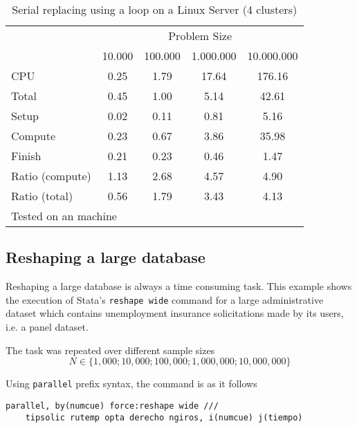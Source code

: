 \documentclass[letterpaper, 10pt]{article}
\begin{document}
\begin{table}[!h]
\centering
\caption{Serial replacing using a loop on a Linux Server (4 clusters)\label{tab:serialreplace_linux}}
\begin{tabular}{l*{4}{c}}\hline
& \multicolumn{4}{c}{Problem Size} \\
& 10.000 &           100.000 &          1.000.000 &         10.000.000 \\ \hline
CPU &     0.25 &      1.79 &     17.64 &    176.16 \\
Total &     0.45 &      1.00 &      5.14 &     42.61 \\
\hspace{2mm} Setup &     0.02 &      0.11 &      0.81 &      5.16 \\
\hspace{2mm} Compute &     0.23 &      0.67 &      3.86 &     35.98 \\
\hspace{2mm} Finish &     0.21 &      0.23 &      0.46 &      1.47 \\
\hline Ratio (compute) &     1.13 &      2.68 &      4.57 &      4.90 \\
Ratio (total) &     0.56 &      1.79 &      3.43 &      4.13 \\
\hline
\multicolumn{5}{l}{\footnotesize Tested on an \unix1 machine}
\end{tabular}
\end{table}

\pagebreak

\subsection{Reshaping a large database}

Reshaping a large database is always a time consuming task. This example shows the execution of Stata's {\tt reshape wide} command for a large administrative dataset which contains unemployment insurance solicitations made by its users, i.e. a panel dataset.

The task was repeated over different sample sizes 
\begin{equation*}N \in \{1,000; 10,000; 100,000; 1,000,000; 10,000,000\}\end{equation*}

Using {\tt parallel} prefix syntax, the command is as it follows

\begin{Verbatim}[tabsize=4, fontsize=\footnotesize]
parallel, by(numcue) force:reshape wide ///
    tipsolic rutemp opta derecho ngiros, i(numcue) j(tiempo)
\end{Verbatim}
\end{document}
